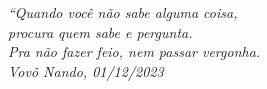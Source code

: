 \begin{epigrafe}
  \vspace*{\fill}
  \begin{flushright}
    \textit{``Quando você não sabe alguma coisa,\\
      procura quem sabe e pergunta.\\
      Pra não fazer feio, nem passar vergonha.\\
      Vovô Nando, 01/12/2023}
  \end{flushright}
\end{epigrafe}
